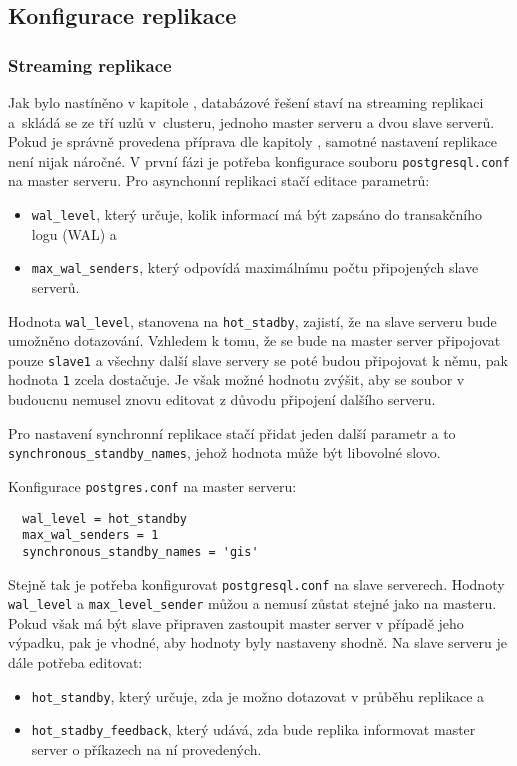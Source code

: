 \subsection{Konfigurace replikace}
\subsubsection{Streaming replikace}

Jak bylo nastíněno v kapitole , databázové řešení staví na streaming replikaci a~skládá se ze tří uzlů v~clusteru, jednoho master serveru a dvou slave serverů. Pokud je správně provedena příprava dle kapitoly , samotné nastavení replikace není nijak náročné. V první fázi je potřeba konfigurace souboru \texttt{postgresql.conf} na master serveru. Pro asynchonní replikaci stačí editace parametrů: 
\begin{itemize}
\item \texttt{wal\_level}, který určuje, kolik informací má být zapsáno do transakčního logu (WAL) a
\item \texttt{max\_wal\_senders}, který odpovídá maximálnímu počtu připojených slave serverů. 
\end{itemize}
Hodnota \texttt{wal\_level}, stanovena na \texttt{hot\_stadby}, zajistí, že na slave serveru bude umožněno dotazování. Vzhledem k tomu, že se bude na master server připojovat pouze \texttt{slave1} a všechny další slave servery se poté budou připojovat k němu, pak hodnota \texttt{1} zcela dostačuje. Je však možné hodnotu zvýšit, aby se soubor v budoucnu nemusel znovu editovat z důvodu připojení dalšího serveru.

Pro nastavení synchronní replikace stačí přidat jeden další parametr a to \texttt{synchronous\_standby\_names}, jehož hodnota může být libovolné slovo. 

Konfigurace \texttt{postgres.conf} na master serveru:
  \begin{lstlisting}
  wal_level = hot_standby
  max_wal_senders = 1
  synchronous_standby_names = 'gis'
  \end{lstlisting}

Stejně tak je potřeba konfigurovat \texttt{postgresql.conf} na slave serverech. Hodnoty \texttt{wal\_level} a \texttt{max\_level\_sender} můžou a nemusí zůstat stejné jako na masteru. Pokud však má být slave připraven zastoupit master server v případě jeho výpadku, pak je vhodné, aby hodnoty byly nastaveny shodně. Na slave serveru je dále potřeba editovat:
\begin{itemize}
\item \texttt{hot\_standby}, který určuje, zda je možno dotazovat v průběhu replikace a 
\item \texttt{hot\_stadby\_feedback}, který udává, zda bude replika informovat master server o příkazech na ní provedených.
\end{itemize}

